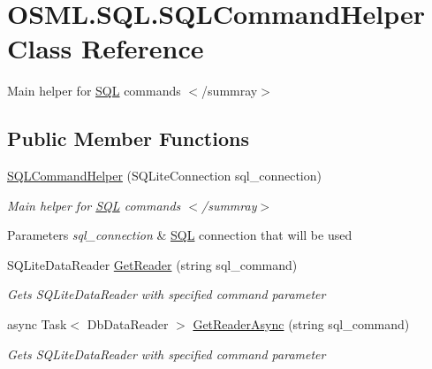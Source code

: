 \hypertarget{classOSML_1_1SQL_1_1SQLCommandHelper}{}\section{O\+S\+M\+L.\+S\+Q\+L.\+S\+Q\+L\+Command\+Helper Class Reference}
\label{classOSML_1_1SQL_1_1SQLCommandHelper}


Main helper for \mbox{\hyperlink{namespaceOSML_1_1SQL}{S\+QL}} commands $<$/summray$>$  


\subsection*{Public Member Functions}
\begin{DoxyCompactItemize}
\item 
\mbox{\label{classOSML_1_1SQL_1_1SQLCommandHelper_acc8e1518ca00301bf93265efd14ab260}} 
\mbox{\hyperlink{classOSML_1_1SQL_1_1SQLCommandHelper_acc8e1518ca00301bf93265efd14ab260}{S\+Q\+L\+Command\+Helper}} (S\+Q\+Lite\+Connection sql\+\_\+connection)
\begin{DoxyCompactList}\small\item\em Main helper for \mbox{\hyperlink{namespaceOSML_1_1SQL}{S\+QL}} commands $<$/summray$>$ 
\begin{DoxyParams}{Parameters}
{\em sql\+\_\+connection} & \mbox{\hyperlink{namespaceOSML_1_1SQL}{S\+QL}} connection that will be used\\
\hline
\end{DoxyParams}
\end{DoxyCompactList}\item 
S\+Q\+Lite\+Data\+Reader \mbox{\hyperlink{classOSML_1_1SQL_1_1SQLCommandHelper_a138f00ffaafdac45507d05875f7f92b5}{Get\+Reader}} (string sql\+\_\+command)
\begin{DoxyCompactList}\small\item\em Gets S\+Q\+Lite\+Data\+Reader with specified command parameter \end{DoxyCompactList}\item 
async Task$<$ Db\+Data\+Reader $>$ \mbox{\hyperlink{classOSML_1_1SQL_1_1SQLCommandHelper_a356b592db2703b8061a7128de02b18a8}{Get\+Reader\+Async}} (string sql\+\_\+command)
\begin{DoxyCompactList}\small\item\em Gets S\+Q\+Lite\+Data\+Reader with specified command parameter \end{DoxyCompactList}\item 

\end{DoxyCompactItemize}
